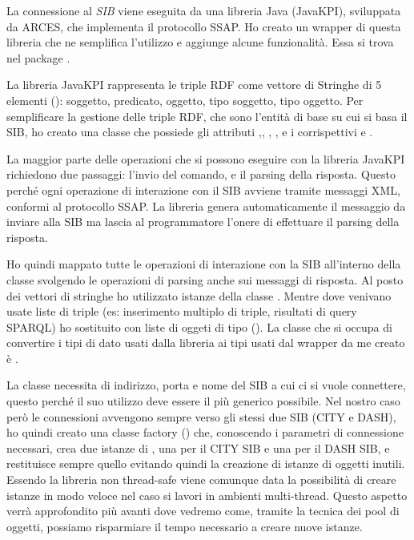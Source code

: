 La connessione al \emph{SIB} viene eseguita da una libreria Java (JavaKPI), sviluppata da ARCES, che implementa il protocollo SSAP. Ho creato un wrapper di questa libreria che ne semplifica l'utilizzo e aggiunge alcune funzionalità. Essa si trova nel package .

La libreria JavaKPI rappresenta le triple RDF come vettore di Stringhe di 5 elementi (): soggetto, predicato, oggetto, tipo soggetto, tipo oggetto. 
Per semplificare la gestione delle triple RDF, che sono l'entità di base su cui si basa il SIB, ho creato una classe  che possiede gli attributi ,, , ,  e i corrispettivi  e .

La maggior parte delle operazioni che si possono eseguire con la libreria JavaKPI richiedono due passaggi: l'invio del comando, e il parsing della risposta. Questo perché ogni operazione di interazione con il SIB avviene tramite messaggi XML, conformi al protocollo SSAP. La libreria genera automaticamente il messaggio da inviare alla SIB ma lascia al programmatore l'onere di effettuare il parsing della risposta. 

Ho quindi mappato tutte le operazioni di interazione con la SIB all'interno della classe  svolgendo le operazioni di parsing anche sui messaggi di risposta. Al posto dei vettori di stringhe ho utilizzato istanze della classe . Mentre dove venivano usate liste di triple (es: inserimento multiplo di triple, risultati di query SPARQL) ho sostituito con liste di oggeti di tipo  (). La classe che si occupa di convertire i tipi di dato usati dalla libreria  ai tipi usati dal wrapper da me creato è .

La classe  necessita di indirizzo, porta e nome del SIB a cui ci si vuole connettere, questo perché il suo utilizzo deve essere il più generico possibile. Nel nostro caso però le connessioni avvengono sempre verso gli stessi due SIB (CITY e DASH), ho quindi creato una classe factory () che, conoscendo i parametri di connessione necessari, crea due istanze di , una per il CITY SIB e una per il DASH SIB, e restituisce sempre quello evitando quindi la creazione di istanze di oggetti inutili. Essendo la libreria  non thread-safe viene comunque data la possibilità di creare istanze in modo veloce nel caso si lavori in ambienti multi-thread. Questo aspetto verrà approfondito più avanti dove vedremo come, tramite la tecnica dei pool di oggetti, possiamo risparmiare il tempo necessario a creare nuove istanze.

